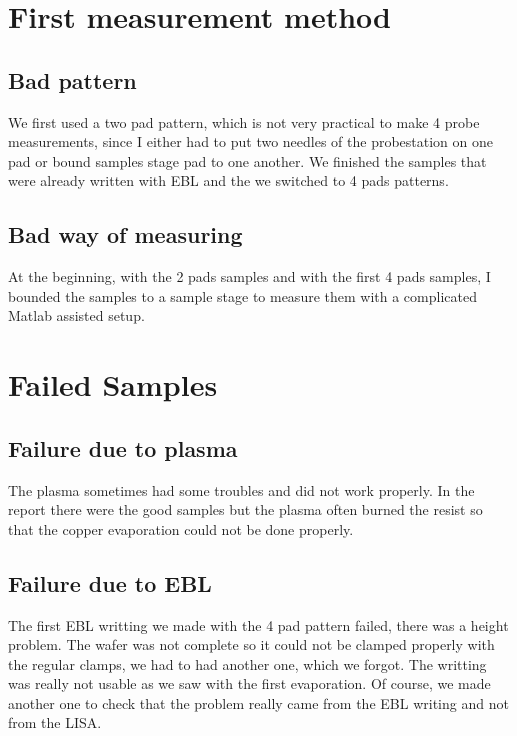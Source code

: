 \chapter{First measurement method}

\section{Bad pattern}
\label{badtests}

We first used a two pad pattern, which is not very practical to make 4 probe measurements, since I either had to put two needles of the probestation on one pad or bound samples stage pad to one another. We finished the samples that were already written with EBL and the we switched to 4 pads patterns.


\section{Bad way of measuring}
\label{badmeasures}
At the beginning, with the 2 pads samples and with the first 4 pads samples, I bounded the samples to a sample stage to measure them with a complicated Matlab assisted setup.
\chapter{Failed Samples}
\section{Failure due to plasma}
\label{badplasma}
The plasma sometimes had some troubles and did not work properly. In the report there were the good samples but the plasma often burned the resist so that the copper evaporation could not be done properly.


\section{Failure due to EBL}
The first EBL writting we made with the 4 pad pattern failed, there was a height problem. The wafer was not complete so it could not be clamped properly with the regular clamps, we had to had another one, which we forgot. The writting was really not usable as we saw with the first evaporation. Of course, we made another one to check that the problem really came from the EBL writing and not from the LISA.


